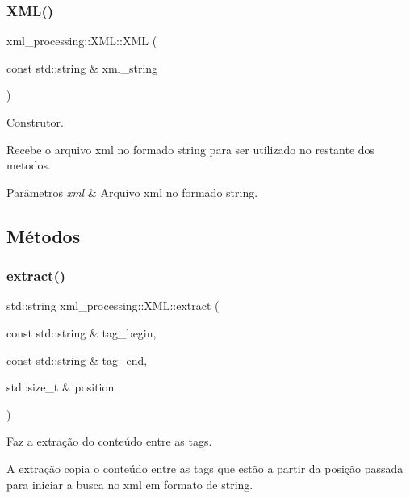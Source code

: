 \subsubsection{\texorpdfstring{X\+M\+L()}{XML()}}
{\footnotesize\ttfamily xml\+\_\+processing\+::\+X\+M\+L\+::\+X\+ML (\begin{DoxyParamCaption}\item[{const std\+::string \&}]{xml\+\_\+string }\end{DoxyParamCaption})}



Construtor. 

Recebe o arquivo xml no formado string para ser utilizado no restante dos metodos.


\begin{DoxyParams}{Parâmetros}
{\em xml} & Arquivo xml no formado string. \\
\hline
\end{DoxyParams}


\subsection{Métodos}
\mbox{\label{classxml__processing_1_1XML_a85d74f298dcdd2810838e2d1665cee6a}} 
\subsubsection{\texorpdfstring{extract()}{extract()}}
{\footnotesize\ttfamily std\+::string xml\+\_\+processing\+::\+X\+M\+L\+::extract (\begin{DoxyParamCaption}\item[{const std\+::string \&}]{tag\+\_\+begin,  }\item[{const std\+::string \&}]{tag\+\_\+end,  }\item[{std\+::size\+\_\+t \&}]{position }\end{DoxyParamCaption})}



Faz a extração do conteúdo entre as tags. 

A extração copia o conteúdo entre as tags que estão a partir da posição passada para iniciar a busca no xml em formato de string.


